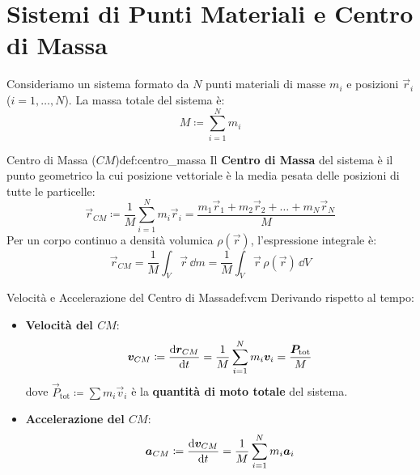 \section{Sistemi di Punti Materiali e Centro di Massa}
\label{sec:centro_massa}

Consideriamo un sistema formato da $N$ punti materiali di masse $m_i$ e posizioni $\vec{r}_i$ ($i = 1, \dots, N$). La massa totale del sistema è:
\begin{equation}
    M \coloneqq \sum_{i=1}^N m_i
\end{equation}

\begin{definizione}{Centro di Massa ($CM$)}{def:centro_massa}
Il \textbf{Centro di Massa} del sistema è il punto geometrico la cui posizione vettoriale è la media pesata delle posizioni di tutte le particelle:
\begin{equation}
    \vec{r}_{CM} \coloneqq \frac{1}{M}\sum_{i=1}^N m_i \vec{r}_i = \frac{m_1\vec{r}_1 + m_2\vec{r}_2 + \dots + m_N\vec{r}_N}{M}
    \label{eq:rcm}
\end{equation}
Per un corpo continuo a densità volumica $\rho(\vec{r})$, l'espressione integrale è:
\begin{equation}
    \vec{r}_{CM} = \frac{1}{M}\int_V \vec{r}\,\dd m = \frac{1}{M}\int_V \vec{r}\,\rho(\vec{r})\,\dd V
    \label{eq:rcm_continuo}
\end{equation}
\end{definizione}

\begin{definizione}{Velocità e Accelerazione del Centro di Massa}{def:vcm}
Derivando rispetto al tempo:
\begin{itemize}
    \item \textbf{Velocità del $CM$}:
    \begin{equation}
        \bm{v}_{CM} \coloneqq \frac{\mathrm{d} \bm{r}_{CM}}{\mathrm{d} t} = \frac{1}{M}\sum_{i=1}^N m_i \bm{v}_i = \frac{\bm{P}_{\text{tot}}}{M}
        \label{eq:vcm}
    \end{equation}
    dove $\vec{P}_{\text{tot}} \coloneqq \sum m_i \vec{v}_i$ è la \textbf{quantità di moto totale} del sistema.
    \item \textbf{Accelerazione del $CM$}:
    \begin{equation}
        \bm{a}_{CM} \coloneqq \frac{\mathrm{d} \bm{v}_{CM}}{\mathrm{d} t} = \frac{1}{M}\sum_{i=1}^N m_i \bm{a}_i
        \label{eq:acm}
    \end{equation}
\end{itemize}
\end{definizione}

